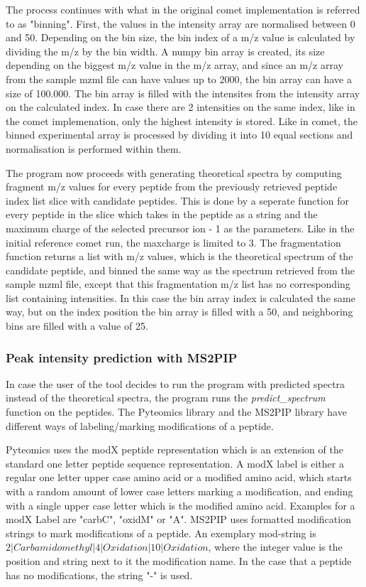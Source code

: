 \documentclass[11pt]{article}
\begin{document}
The process continues with what in the original comet implementation is referred to as "binning". First, the values in the intensity array are normalised between 0 and 50. Depending on the bin size, the bin index of a m/z value is calculated by dividing the m/z by the bin width. A numpy bin array is created, its size depending on the biggest m/z value in the m/z array, and since an m/z array from the sample mzml file can have values up to 2000, the bin array can have a size of 100.000. The bin array is filled with the intensites from the intensity array on the calculated index. In case there are 2 intensities on the same index, like in the comet implemenation, only the highest intensity is stored. Like in comet, the binned experimental array is processed by dividing it into 10 equal sections and normalisation is performed within them.

The program now proceeds with generating theoretical spectra by computing fragment m/z values for every peptide from the previously retrieved peptide index list slice with candidate peptides. This is done by a seperate function for every peptide in the slice which takes in the peptide as a string and the maximum charge of the selected precursor ion - 1 as the parameters. Like in the initial reference comet run, the maxcharge is limited to 3. The fragmentation function returns a list with m/z values, which is the theoretical spectrum of the candidate peptide, and binned the same way as the spectrum retrieved from the sample mzml file, except that this fragmentation m/z list has no corresponding list containing intensities. In this case the bin array index is calculated the same way, but on the index position the bin array is filled with a 50, and neighboring bins are filled with a value of 25. 

\subsubsection{Peak intensity prediction with MS2PIP}
In case the user of the tool decides to run the program with predicted spectra instead of the theoretical spectra, the program runs the \textit{predict\_spectrum} function on the peptides. The Pyteomics library and the MS2PIP library have different ways of labeling/marking modifications of a peptide. 

Pyteomics uses the modX peptide representation which is an extension of the standard one letter peptide sequence representation. A modX label is either a regular one letter upper case amino acid or a modified amino acid, which starts with a random amount of lower case letters marking a modification, and ending with a single upper case letter which is the modified amino acid. Examples for a modX Label are "carbC", "oxidM" or "A". MS2PIP uses formatted modification strings to mark modifications of a peptide. An exemplary mod-string is \begin{math}2|Carbamidomethyl|4|Oxidation|10|Oxidation\end{math}, where the integer value is the position and string next to it the modification name. In the case that a peptide has no modifications, the string "-" is used. 
\end{document}
